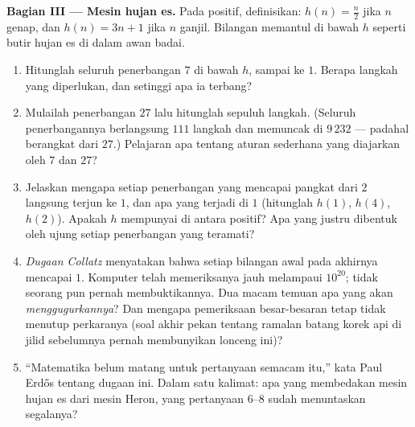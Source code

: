\begin{problem}
\medskip
\noindent\textbf{Bagian III --- Mesin hujan es.}
Pada  positif, definisikan: $h(n) = \frac n2$ jika $n$ genap,
dan $h(n) = 3n + 1$ jika $n$ ganjil. Bilangan memantul di bawah $h$ seperti
butir hujan es di dalam awan badai.
\begin{enumerate}[resume]
  \item Hitunglah seluruh penerbangan $7$ di bawah $h$, sampai ke $1$.
        Berapa langkah yang diperlukan, dan setinggi apa ia terbang?
  \item Mulailah penerbangan $27$ lalu hitunglah sepuluh langkah. (Seluruh
        penerbangannya berlangsung $111$ langkah dan memuncak di $9\,232$ ---
        padahal berangkat dari $27$.) Pelajaran apa tentang aturan
        sederhana yang diajarkan oleh $7$ dan $27$?
  \item Jelaskan mengapa setiap penerbangan yang mencapai pangkat dari $2$
        langsung terjun ke $1$, dan apa yang terjadi di $1$
        (hitunglah $h(1)$, $h(4)$, $h(2)$). Apakah $h$ mempunyai
         di antara  positif? Apa yang justru
        dibentuk oleh ujung setiap penerbangan yang teramati?
  \item \emph{Dugaan Collatz} menyatakan bahwa setiap bilangan
        awal pada akhirnya mencapai $1$. Komputer telah memeriksanya
        jauh melampaui $10^{20}$; tidak seorang pun pernah membuktikannya. Dua
        macam temuan apa yang akan \emph{menggugurkannya}? Dan mengapa
        pemeriksaan besar-besaran tetap tidak menutup perkaranya
        (soal akhir pekan tentang ramalan batang korek api di jilid sebelumnya
        pernah membunyikan lonceng ini)?
  \item ``Matematika belum matang untuk pertanyaan semacam itu,'' kata
        Paul Erd\H{o}s tentang dugaan ini. Dalam satu kalimat: apa
        yang membedakan mesin hujan es dari mesin Heron, yang
        pertanyaan 6--8 sudah menuntaskan segalanya?
\end{enumerate}


\end{problem}
